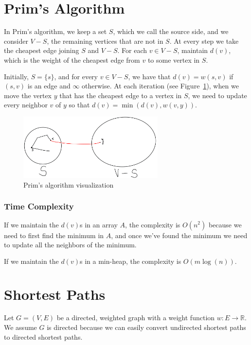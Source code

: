 \section{Prim's Algorithm}

In Prim's algorithm, we keep a set $S$, which we call the source side,
and we consider $V - S$, the remaining vertices that are not in $S$.
At every step we take the cheapest edge joining $S$ and
$V - S$. For each $v \in V - S$, maintain $d(v)$, which is the
weight of the cheapest edge from $v$ to some vertex in $S$. 

Initially, $S = \{ s \}$, and for every $v \in V - S$, we have that
$d(v) = w(s, v)$ if $(s, v)$ is an edge and $\infty$ otherwise. At
each iteration (see Figure~\ref{fig:prim}), when we move the vertex
$y$ that has the cheapest edge to a vertex in $S$, we need to update
every neighbor $v$ of $y$ so that $d(v) = \min(d(v), w(v, y))$.

\begin{figure}[hpt]
    \centering
    \includegraphics[width=0.65\textwidth]{figures/prim.jpeg}
    \caption{Prim's algorithm visualization}
    \label{fig:prim}
\end{figure}

\subsubsection{Time Complexity}

If we maintain the $d(v)$s in an array $A$, the complexity is $O(n^2)$
because we need to first find the minimum in $A$, and once we've found
the minimum we need to update all the neighbors of the minimum.

If we maintain the $d(v)$s in a min-heap, the complexity is $O(m\log
(n))$.

\section{Shortest Paths}

Let $G = (V, E)$ be a directed, weighted graph with a weight function
$w : E \to \mathbb{R}$. We assume $G$ is directed because we can
easily convert undirected shortest paths to directed shortest paths.

